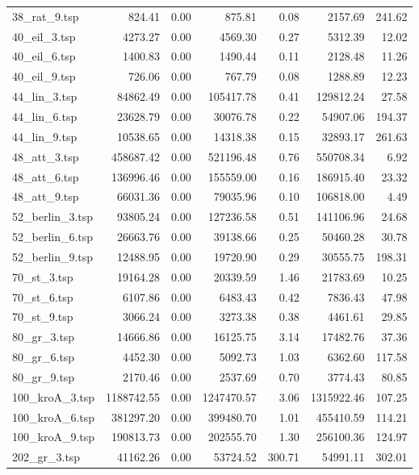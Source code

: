 \begin{table}[H]
\begin{tabular}{|l||r|r||r|r||r|r|}
38\_rat\_9.tsp & 824.41 & 0.00 & 875.81 & 0.08 & 2157.69 & 241.62 \\
40\_eil\_3.tsp & 4273.27 & 0.00 & 4569.30 & 0.27 & 5312.39 & 12.02 \\
40\_eil\_6.tsp & 1400.83 & 0.00 & 1490.44 & 0.11 & 2128.48 & 11.26 \\
40\_eil\_9.tsp & 726.06 & 0.00 & 767.79 & 0.08 & 1288.89 & 12.23 \\
44\_lin\_3.tsp & 84862.49 & 0.00 & 105417.78 & 0.41 & 129812.24 & 27.58 \\
44\_lin\_6.tsp & 23628.79 & 0.00 & 30076.78 & 0.22 & 54907.06 & 194.37 \\
44\_lin\_9.tsp & 10538.65 & 0.00 & 14318.38 & 0.15 & 32893.17 & 261.63 \\
48\_att\_3.tsp & 458687.42 & 0.00 & 521196.48 & 0.76 & 550708.34 & 6.92 \\
48\_att\_6.tsp & 136996.46 & 0.00 & 155559.00 & 0.16 & 186915.40 & 23.32 \\
48\_att\_9.tsp & 66031.36 & 0.00 & 79035.96 & 0.10 & 106818.00 & 4.49 \\
52\_berlin\_3.tsp & 93805.24 & 0.00 & 127236.58 & 0.51 & 141106.96 & 24.68 \\
52\_berlin\_6.tsp & 26663.76 & 0.00 & 39138.66 & 0.25 & 50460.28 & 30.78 \\
52\_berlin\_9.tsp & 12488.95 & 0.00 & 19720.90 & 0.29 & 30555.75 & 198.31 \\
70\_st\_3.tsp & 19164.28 & 0.00 & 20339.59 & 1.46 & 21783.69 & 10.25 \\
70\_st\_6.tsp & 6107.86 & 0.00 & 6483.43 & 0.42 & 7836.43 & 47.98 \\
70\_st\_9.tsp & 3066.24 & 0.00 & 3273.38 & 0.38 & 4461.61 & 29.85 \\
80\_gr\_3.tsp & 14666.86 & 0.00 & 16125.75 & 3.14 & 17482.76 & 37.36 \\
80\_gr\_6.tsp & 4452.30 & 0.00 & 5092.73 & 1.03 & 6362.60 & 117.58 \\
80\_gr\_9.tsp & 2170.46 & 0.00 & 2537.69 & 0.70 & 3774.43 & 80.85 \\
100\_kroA\_3.tsp & 1188742.55 & 0.00 & 1247470.57 & 3.06 & 1315922.46 & 107.25 \\
100\_kroA\_6.tsp & 381297.20 & 0.00 & 399480.70 & 1.01 & 455410.59 & 114.21 \\
100\_kroA\_9.tsp & 190813.73 & 0.00 & 202555.70 & 1.30 & 256100.36 & 124.97 \\
202\_gr\_3.tsp & 41162.26 & 0.00 & 53724.52 & 300.71 & 54991.11 & 302.01 \\

\end{tabular}
\end{table}
